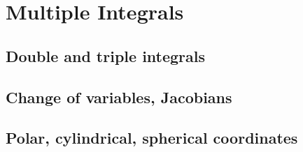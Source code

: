
\section{Multiple Integrals}

\subsection{Double and triple integrals}


\subsection{Change of variables, Jacobians}


\subsection{Polar, cylindrical, spherical coordinates}

